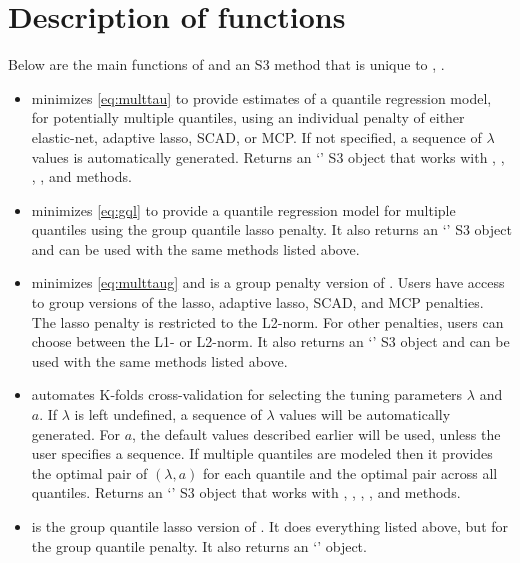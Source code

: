 \section{Description of functions}\label{description-of-functions}

Below are the main functions of  and an S3 method that is unique to , .

\begin{itemize}
\tightlist
\item
   minimizes \eqref{eq:multtau} to provide estimates of a quantile regression model, for potentially multiple quantiles, using an individual penalty of either elastic-net, adaptive lasso, SCAD, or MCP. If not specified, a sequence of \(\lambda\) values is automatically generated. Returns an `' S3 object that works with , , , , and  methods.
\item
   minimizes \eqref{eq:gql} to provide a quantile regression model for multiple quantiles using the group quantile lasso penalty. It also returns an `' S3 object and can be used with the same methods listed above.
\item
   minimizes \eqref{eq:multtaug} and is a group penalty version of . Users have access to group versions of the lasso, adaptive lasso, SCAD, and MCP penalties. The lasso penalty is restricted to the L2-norm. For other penalties, users can choose between the L1- or L2-norm. It also returns an `' S3 object and can be used with the same methods listed above.
\item
   automates K-folds cross-validation for selecting the tuning parameters \(\lambda\) and \(a\). If \(\lambda\) is left undefined, a sequence of \(\lambda\) values will be automatically generated. For \(a\), the default values described earlier will be used, unless the user specifies a sequence. If multiple quantiles are modeled then it provides the optimal pair of \((\lambda,a)\) for each quantile and the optimal pair across all quantiles. Returns an `' S3 object that works with , , , , and  methods.
\item
   is the group quantile lasso version of . It does everything listed above, but for the group quantile penalty. It also returns an `' object.

\end{itemize}
